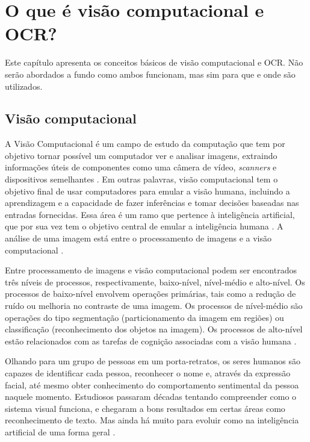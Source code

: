 \chapter{O que é visão computacional e OCR?}

Este capítulo apresenta os conceitos básicos de visão computacional e OCR. Não serão abordados a fundo como ambos funcionam, mas sim para que e onde são utilizados.  

\section{Visão computacional}

A Visão Computacional é um campo de estudo da computação que tem por objetivo tornar possível um computador ver e analisar imagens, extraindo informações úteis de componentes como uma câmera de vídeo, \textit{scanners} e dispositivos semelhantes \cite{computervision}. Em outras palavras, visão computacional tem o objetivo final de usar computadores para emular a visão humana, incluindo a aprendizagem e a capacidade de fazer inferências e tomar decisões baseadas nas entradas fornecidas. Essa área é um ramo que pertence à inteligência artificial, que por sua vez tem o objetivo central de emular a inteligência humana \cite{computervision}. A análise de uma imagem está entre o processamento de imagens e a visão computacional \cite{gonzalez}.

Entre processamento de imagens e visão computacional podem ser encontrados três níveis de processos, respectivamente, baixo-nível, nível-médio e alto-nível. Os processos de baixo-nível envolvem operações primárias, tais como a redução de ruído ou melhoria no contraste de uma imagem. Os processos de nível-médio são operações do tipo segmentação (particionamento da imagem em regiões) ou classificação (reconhecimento dos objetos na imagem). Os processos de alto-nível estão relacionados com as tarefas de cognição associadas com a visão humana \cite{gonzalez}.

Olhando para um grupo de pessoas em um porta-retratos, os seres humanos são capazes de identificar cada pessoa, reconhecer o nome e, através da expressão facial, até mesmo obter conhecimento do comportamento sentimental da pessoa naquele momento. Estudiosos passaram décadas tentando compreender como o sistema visual funciona, e chegaram a bons resultados em certas áreas como reconhecimento de texto. Mas ainda há muito para evoluir como na inteligência artificial de uma forma geral \cite{marr} \cite{palmer}.

